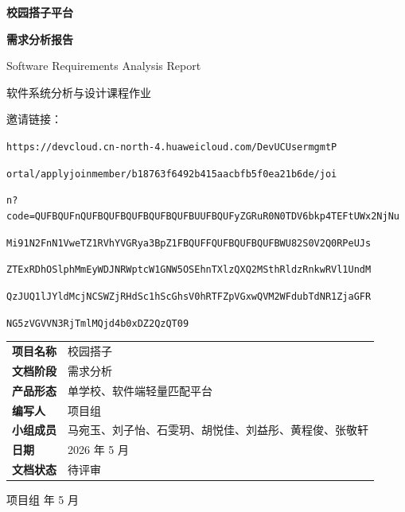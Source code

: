 \documentclass[UTF8,zihao=-4,scheme=chinese]{ctexrep}
\renewcommand{\arraystretch}{1.12}
\newcommand{\ReportMetaTable}{%
  \begin{center}
  \renewcommand{\arraystretch}{1.18}
  \begin{tabular}{>{\songti\bfseries}p{0.22\textwidth}p{0.52\textwidth}}
    \toprule
    项目名称 & 校园搭子 \\
    文档阶段 & 需求分析 \\
    产品形态 & 单学校、软件端轻量匹配平台 \\
    编写人 & 项目组 \\
    小组成员 & 马宛玉、刘子怡、石雯玥、胡悦佳、刘益彤、黄程俊、张敬轩 \\
    日期 & 2026 年 5 月 \\
    文档状态 & 待评审 \\
    \bottomrule
  \end{tabular}
  \end{center}
}
\begin{document}
\begin{titlepage}
  \centering
  \vspace*{2.2cm}
  {\songti\bfseries\color{black} 校园搭子平台\par}
  \vspace{0.65cm}
  {\songti\bfseries 需求分析报告\par}
  \vspace{0.35cm}
  {\Large Software Requirements Analysis Report\par}
  \vspace{1.4cm}
  {\songti 软件系统分析与设计课程作业\par}
  \vspace{0.35cm}
  \begin{minipage}{0.78\textwidth}
    \raggedright
    {\scriptsize\songti 邀请链接：\par
    \texttt{https://devcloud.cn-north-4.huaweicloud.com/DevUCUsermgmtP}\par
    \texttt{ortal/applyjoinmember/b18763f6492b415aacbfb5f0ea21b6de/joi}\par
    \texttt{n?code=QUFBQUFnQUFBQUFBQUFBQUFBQUFBUUFBQUFyZGRuR0N0TDV6bkp4TEFtUWx2NjNu}\par
    \texttt{Mi91N2FnN1VweTZ1RVhYVGRya3BpZ1FBQUFFQUFBQUFBQUFBWU82S0V2Q0RPeUJs}\par
    \texttt{ZTExRDhOSlphMmEyWDJNRWptcW1GNW5OSEhnTXlzQXQ2MSthRldzRnkwRVl1UndM}\par
    \texttt{QzJUQ1lJYldMcjNCSWZjRHdSc1hScGhsV0hRTFZpVGxwQVM2WFdubTdNR1ZjaGFR}\par
    \texttt{NG5zVGVVN3RjTmlMQjd4b0xDZ2QzQT09}\par}
  \end{minipage}
  \vfill
  \begin{InfoBox}
    \ReportMetaTable
  \end{InfoBox}
  \vfill
  { 项目组  年 5 月\par}
\end{titlepage}

\tableofcontents
\clearpage


\end{document}
